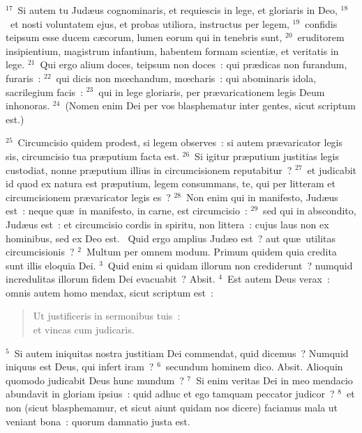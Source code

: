 ${}^{17}$~Si autem tu Jud\ae us cognominaris, et requiescis in lege, et gloriaris in Deo,
${}^{18}$~et nosti voluntatem ejus, et probas utiliora, instructus per legem,
${}^{19}$~confidis teipsum esse ducem c\ae corum, lumen eorum qui in tenebris sunt,
${}^{20}$~eruditorem insipientium, magistrum infantium, habentem formam scienti\ae , et veritatis in lege.
${}^{21}$~Qui ergo alium doces, teipsum non doces~: qui pr\ae dicas non furandum, furaris~:
${}^{22}$~qui dicis non mœchandum, mœcharis~: qui abominaris idola, sacrilegium facis~:
${}^{23}$~qui in lege gloriaris, per pr\ae varicationem legis Deum inhonoras.
${}^{24}$~(Nomen enim Dei per vos blasphematur inter gentes, sicut scriptum est.)


${}^{25}$~Circumcisio quidem prodest, si legem observes~: si autem pr\ae varicator legis sis, circumcisio tua pr\ae putium facta est.
${}^{26}$~Si igitur pr\ae putium justitias legis custodiat, nonne pr\ae putium illius in circumcisionem reputabitur~?
${}^{27}$~et judicabit id quod ex natura est pr\ae putium, legem consummans, te, qui per litteram et circumcisionem pr\ae varicator legis es~?
${}^{28}$~Non enim qui in manifesto, Jud\ae us est~: neque qu\ae\ in manifesto, in carne, est circumcisio~:
${}^{29}$~sed qui in abscondito, Jud\ae us est~: et circumcisio cordis in spiritu, non littera~: cujus laus non ex hominibus, sed ex Deo est.
~Quid ergo amplius Jud\ae o est~? aut qu\ae\ utilitas circumcisionis~?
${}^{2}$~Multum per omnem modum. Primum quidem quia credita sunt illis eloquia Dei.
${}^{3}$~Quid enim si quidam illorum non crediderunt~? numquid incredulitas illorum fidem Dei evacuabit~? Absit.
${}^{4}$~Est autem Deus verax~: omnis autem homo mendax, sicut scriptum est~: \begin{flushleft}\begin{verse}Ut justificeris in sermonibus tuis~:\\ et vincas cum judicaris.\end{verse}\end{flushleft}


${}^{5}$~Si autem iniquitas nostra justitiam Dei commendat, quid dicemus~? Numquid iniquus est Deus, qui infert iram~?
${}^{6}$~secundum hominem dico. Absit. Alioquin quomodo judicabit Deus hunc mundum~?
${}^{7}$~Si enim veritas Dei in meo mendacio abundavit in gloriam ipsius~: quid adhuc et ego tamquam peccator judicor~?
${}^{8}$~et non (sicut blasphemamur, et sicut aiunt quidam nos dicere) faciamus mala ut veniant bona~: quorum damnatio justa est.


